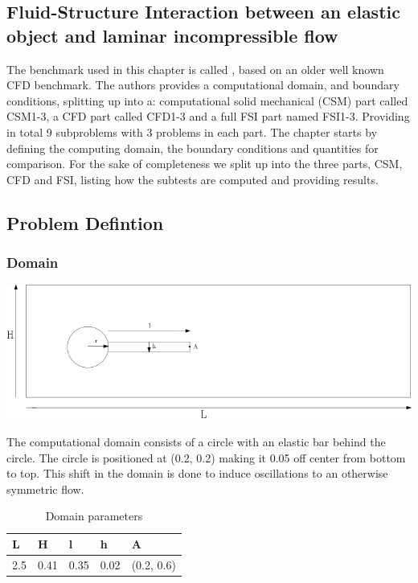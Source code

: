 \subsection{Fluid-Structure Interaction between an elastic object and laminar incompressible flow} \label{sec:HronTurek}
The benchmark used in this chapter is called  \cite{Hron2006a}, based on an older well known CFD benchmark\cite{Turek1996}. 
The authors provides a computational domain, and boundary conditions, splitting up into a: computational solid mechanical (CSM) part called CSM1-3, a CFD part called CFD1-3 and a full FSI part named FSI1-3. Providing in total 9 subproblems with 3 problems in each part. The chapter starts by defining the computing domain, the boundary conditions and quantities for comparison. For the sake of completeness we split up into the three parts, CSM, CFD and FSI, listing how the subtests are computed and providing results.

\subsection*{Problem Defintion}
\subsubsection*{Domain}
\begin{center}
\includegraphics[scale=0.4]{./Verification_Validation/Hron_Turek/Domain_drawing.png}
\end{center}

The computational domain consists of a circle with an elastic bar behind the circle. The circle is positioned at (0.2, 0.2) making it 0.05 off center from bottom to top. This shift in the domain is done to induce oscillations to an otherwise symmetric flow.
\begin{table}[H]
\centering
\caption{Domain parameters}
\label{my-label}
\begin{tabular}{|l|l|l|l|l|}
\hline
L & H & l & h & A \\ \hline
2.5 & 0.41 & 0.35 & 0.02 & (0.2, 0.6) \\ \hline
\end{tabular}
\end{table}

